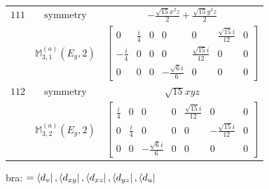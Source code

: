 \documentclass[fleqn,8pt,landscape]{jsarticle}
\begin{document}
\begin{longtable}{ccc}
$ 111 $ & $ \text{symmetry} $ & $ - \frac{\sqrt{15} x^{2} z}{2} + \frac{\sqrt{15} y^{2} z}{2} $ \\
$  $ & $ \mathbb{M}_{3,1}^{(a)}(E_{g},2) $ & $ \begin{bmatrix} 0 & \frac{i}{4} & 0 & 0 & 0 & \frac{\sqrt{15} i}{12} & 0 \\ - \frac{i}{4} & 0 & 0 & 0 & \frac{\sqrt{15} i}{12} & 0 & 0 \\ 0 & 0 & 0 & - \frac{\sqrt{6} i}{6} & 0 & 0 & 0 \end{bmatrix} $ \\ \hline
$ 112 $ & $ \text{symmetry} $ & $ \sqrt{15} x y z $ \\
$  $ & $ \mathbb{M}_{3,2}^{(a)}(E_{g},2) $ & $ \begin{bmatrix} \frac{i}{4} & 0 & 0 & 0 & \frac{\sqrt{15} i}{12} & 0 & 0 \\ 0 & \frac{i}{4} & 0 & 0 & 0 & - \frac{\sqrt{15} i}{12} & 0 \\ 0 & 0 & - \frac{\sqrt{6} i}{6} & 0 & 0 & 0 & 0 \end{bmatrix} $ \\ \hline
\end{longtable}
bra: $=\bra{d_{v}}, \bra{d_{xy}}, \bra{d_{xz}}, \bra{d_{yz}}, \bra{d_{u}}$
\end{document}
